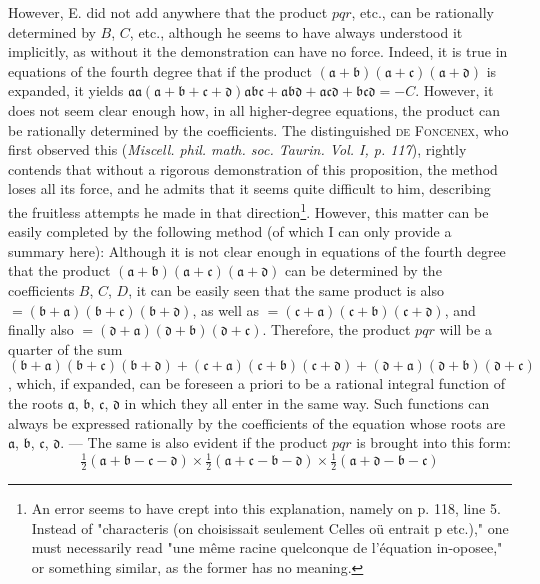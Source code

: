 \documentclass[12pt]{memoir}
\theoremstyle{plain}
\theoremstyle{remark}
\begin{document}
However, \textsc{E.} did not add anywhere that the product \(pqr\), etc., can be rationally determined by \(B\), \(C\), etc., although he seems to have always understood it implicitly, as without it the demonstration can have no force. Indeed, it is true in equations of the fourth degree that if the product \((\mathfrak{a} + \mathfrak{b})(\mathfrak{a} + \mathfrak{c})(\mathfrak{a} + \mathfrak{d})\) is expanded, it yields \(\mathfrak{a}\mathfrak{a}(\mathfrak{a} + \mathfrak{b} + \mathfrak{c} + \mathfrak{d}) \mathfrak{a}\mathfrak{b}\mathfrak{c}+\mathfrak{a}\mathfrak{b}\mathfrak{d}+\mathfrak{a}\mathfrak{c}\mathfrak{d}+\mathfrak{b}\mathfrak{c}\mathfrak{d}= - C\). However, it does not seem clear enough how, in all higher-degree equations, the product can be rationally determined by the coefficients. The distinguished \textsc{de Foncenex}, who first observed this (\textit{Miscell. phil. math. soc. Taurin. Vol. I, p. 117}), rightly contends that without a rigorous demonstration of this proposition, the method loses all its force, and he admits that it seems quite difficult to him, describing the fruitless attempts he made in that direction\footnote{An error seems to have crept into this explanation, namely on p. 118, line 5. Instead of "characteris (on choisissait seulement Celles oü entrait p etc.)," one must necessarily read "une même racine quelconque de l'équation in-oposee," or something similar, as the former has no meaning.}. However, this matter can be easily completed by the following method (of which I can only provide a summary here): Although it is not clear enough in equations of the fourth degree that the product \((\mathfrak{a} + \mathfrak{b})(\mathfrak{a} + \mathfrak{c})(\mathfrak{a} + \mathfrak{d})\) can be determined by the coefficients \(B\), \(C\), \(D\), it can be easily seen that the same product is also \(= (\mathfrak{b} + \mathfrak{a})(\mathfrak{b} + \mathfrak{c})(\mathfrak{b} + \mathfrak{d})\), as well as \( = (\mathfrak{c} + \mathfrak{a})(\mathfrak{c} + \mathfrak{b})(\mathfrak{c} + \mathfrak{d})\), and finally also \( = (\mathfrak{d} + \mathfrak{a})(\mathfrak{d} + \mathfrak{b})(\mathfrak{d} + \mathfrak{c})\). Therefore, the product \(pqr\) will be a quarter of the sum \((\mathfrak{b} + \mathfrak{a})(\mathfrak{b} + \mathfrak{c})(\mathfrak{b} + \mathfrak{d})+(\mathfrak{c} + \mathfrak{a})(\mathfrak{c} + \mathfrak{b})(\mathfrak{c} + \mathfrak{d})+(\mathfrak{d} + \mathfrak{a})(\mathfrak{d} + \mathfrak{b})(\mathfrak{d} + \mathfrak{c})\), which, if expanded, can be foreseen a priori to be a rational integral function of the roots \(\mathfrak{a}\), \(\mathfrak{b}\), \(\mathfrak{c}\), \(\mathfrak{d}\) in which they all enter in the same way. Such functions can always be expressed rationally by the coefficients of the equation whose roots are \(\mathfrak{a}\), \(\mathfrak{b}\), \(\mathfrak{c}\), \(\mathfrak{d}\). — The same is also evident if the product \(pqr\) is brought into this form: \[ \tfrac{1}{2}\left( \mathfrak{a} + \mathfrak{b} - \mathfrak{c} - \mathfrak{d}  \right) \times  \tfrac{1}{2}\left( \mathfrak{a} + \mathfrak{c} - \mathfrak{b} - \mathfrak{d}  \right)  \times  \tfrac{1}{2}\left( \mathfrak{a} + \mathfrak{d} - \mathfrak{b} - \mathfrak{c}  \right)  \]
\end{document}

